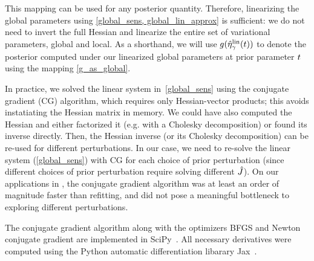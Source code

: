 This mapping can be used for any posterior quantity.
Therefore, linearizing the global parameters using \eqref{global_sens, global_lin_approx} is sufficient:
we do not need to invert the full Hessian
and linearize the entire set of variational parameters, global and local.
As a shorthand, we will use $g(\hat\eta^{\mathrm{lin}}_\gamma(t))$ to
denote the posterior computed under our linearized global parameters
at prior parameter $t$ using the mapping \eqref{g_as_global}.

In practice, we solved the linear system in~\eqref{global_sens} using
the conjugate gradient (CG) algorithm, which requires only Hessian-vector products;
this avoids instatiating the Hessian matrix in memory.
We could have also computed the Hessian and
either factorized it (e.g. with a Cholesky decomposition) or found its inverse directly.
Then, the Hessian inverse (or its Cholesky decomposition) can
be re-used for different perturbations.
In our case, we need to re-solve the linear system (\eqref{global_sens}) with
CG for each choice of prior perturbation (since different choices of prior perturbation
require solving different $\hat J$).
On our applications in , the conjugate gradient algorithm was at least
an order of magnitude faster than refitting, and did not pose a meaningful bottleneck
to exploring different perturbations.

The conjugate gradient algorithm along with
the optimizers BFGS and Newton conjugate gradient
are implemented in SciPy~\citep{scipy}.
All necessary derivatives were computed using the Python
automatic differentiation libarary Jax~\citep{jax2018github}.
